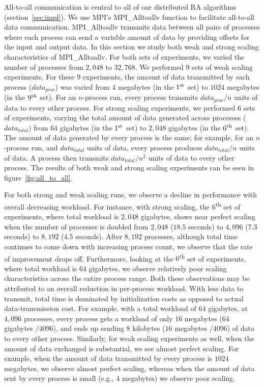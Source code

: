 All-to-all communication is central to all of our distributed RA algorithms (section~\ref{sec:impl}).
We use MPI's MPI\_Alltoallv function to facilitate all-to-all data communication.
MPI\_Alltoallv transmits data between all pairs of processes where each process can send a variable amount of data by providing offsets for the input and output data. In this section we study both weak and strong scaling characteristics of MPI\_Alltoallv.
For both sets of experiments, we varied the number of processes from $2,\!048$ to $32,\!768$. We performed $9$ sets of weak scaling experiments. For these $9$ experiments, the amount of data transmitted by each process ($\mathit{data}_\mathit{proc}$) was varied from $4$ megabytes (in the $1\textsuperscript{st}$ set) to $1024$ megabytes (in the $9\textsuperscript{th}$ set). For an $n$-process run, every process transmits $\mathit{data}_\mathit{proc}/n$ units of data to every other process. For strong scaling experiments, we performed 6 sets of experiments, varying the total amount of data generated across processes ($\mathit{data}_\mathit{total}$) from $64$ gigabytes (in the $1\textsuperscript{st}$ set) to $2,\!048$ gigabytes (in the $6\textsuperscript{th}$ set). The amount of data generated by every process is the same; for example, for an $n$-process run, and $\mathit{data}_\mathit{total}$ units of data, every process produces $\mathit{data}_\mathit{total}/n$ units of data. A process then transmits $\mathit{data}_\mathit{total}/{n^2}$ units of data to every other process. The results of both weak and strong scaling experiments can be seen in figure~\ref{fig:all_to_all}.

For both strong and weak scaling runs, we observe a decline in performance with overall decreasing workload. For instance, with strong scaling, the $6$\textsuperscript{th} set of experiments, where total workload is $2,\!048$ gigabytes, shows near perfect scaling when the number of processes is doubled from $2,\!048$ ($18.5$ seconds) to $4,\!096$ ($7.3$ seconds) to $8,\!192$ ($4.5$ seconds). After $8,\!192$ processes, although total time continues to come down with increasing process count, we observe that the rate of improvement drops off. Furthermore, looking at the $6$\textsuperscript{th} set of experiments, where total workload is $64$ gigabytes, we observe relatively poor scaling characteristics across the entire process range. Both these observations may be attributed to an overall reduction in per-process workload. With less data to transmit, total time is dominated by initialization costs as opposed to actual data-transmission cost. For example, with a total workload of $64$ gigabytes, at $4,\!096$ processes, every process gets a workload of only $16$ megabytes ($64$ gigabytes $/ 4096$), and ends up sending $8$ kilobytes ($16$ megabytes $/ 4096$) of data to every other process. Similarly, for weak scaling experiments as well, when the amount of data exchanged is substantial, we see almost perfect scaling. For example, when the amount of data transmitted by every process is $1024$ megabytes, we observe almost perfect scaling, whereas when the amount of data sent by every process is small (e.g., $4$ megabytes) we observe poor scaling.


